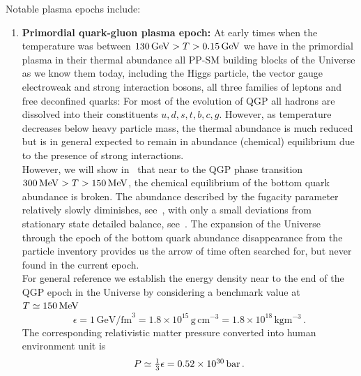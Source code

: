 Notable plasma epochs include: 
\begin{enumerate}
\item \textbf{Primordial quark-gluon plasma epoch:} 
At early times when the temperature was between $130\text{\,GeV}>T>0.15\text{\,GeV}$ we have in the primordial plasma in their thermal abundance all PP-SM building blocks of the Universe as we know them today, including the Higgs particle, the vector gauge electroweak and strong interaction bosons, all three families of leptons and free deconfined quarks: For most of the evolution of QGP all hadrons are dissolved into their constituents $u,d,s,t,b,c,g$. However, as temperature decreases below heavy particle mass, the thermal abundance is much reduced but is in general expected to remain in abundance (chemical) equilibrium due to the presence of strong interactions. \\[0.2cm]
%
However, we will show in~ that near to the QGP phase transition $300\, \mathrm{MeV}>T>150\text{\,MeV}$, the chemical equilibrium of the bottom quark abundance is broken. The abundance described by the fugacity parameter relatively slowly diminishes, see~, with only a small deviations from stationary state detailed balance, see~. The expansion of the Universe through the epoch of the bottom quark abundance disappearance from the particle inventory provides us the arrow of time often searched for, but never found in the current epoch.\\[0.2cm]
%
For general reference we establish the energy density near to the end of the QGP epoch in the Universe by considering a benchmark value at $T\simeq 150\text{\,MeV}$
\begin{equation} \label{endensval}
\epsilon=1\,\mathrm{GeV/fm}^3
= 1.8\times 10^{15}\,\mathrm{g\,cm^{-3}} 
=1.8\times 10^{18}\,\mathrm{kg m^{-3}}\,.
\end{equation}
The corresponding relativistic matter pressure converted into human environment unit is
\begin{equation} \label{presval}
P\simeq \textstyle\frac{1}{3} \epsilon=0.52\times 10^{30} \,\mathrm{bar}\,.
\end{equation}
%

\end{enumerate}
